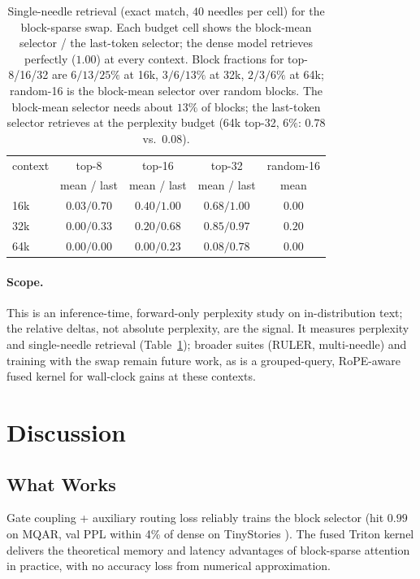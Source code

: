 \documentclass[10pt,letterpaper]{article}
\begin{document}
\begin{table}[h]
\centering
\caption{Single-needle retrieval (exact match, $40$ needles per cell) for the
block-sparse swap. Each budget cell shows the block-mean selector / the last-token
selector; the dense model retrieves perfectly ($1.00$) at every context. Block
fractions for top-8/16/32 are $6/13/25\%$ at 16k, $3/6/13\%$ at 32k, $2/3/6\%$ at
64k; random-16 is the block-mean selector over random blocks. The block-mean
selector needs about $13\%$ of blocks; the last-token selector retrieves at the
perplexity budget (64k top-32, $6\%$: $0.78$ vs.\ $0.08$).}
\label{tab:niah}
\small
\begin{tabular}{lcccc}
\toprule
context & top-8 & top-16 & top-32 & random-16 \\
 & mean / last & mean / last & mean / last & mean \\
\midrule
16k & $0.03/0.70$ & $0.40/1.00$ & $0.68/1.00$ & $0.00$ \\
32k & $0.00/0.33$ & $0.20/0.68$ & $0.85/0.97$ & $0.20$ \\
64k & $0.00/0.00$ & $0.00/0.23$ & $0.08/0.78$ & $0.00$ \\
\bottomrule
\end{tabular}
\end{table}

\paragraph{Scope.} This is an inference-time, forward-only perplexity study on
in-distribution text; the relative deltas, not absolute perplexity, are the signal.
It measures perplexity and single-needle retrieval (Table~\ref{tab:niah}); broader
suites (RULER, multi-needle) and training with the swap remain future work, as is a
grouped-query,
RoPE-aware fused kernel for wall-clock gains at these contexts.

\section{Discussion}\label{sec:discussion}

\subsection{What Works}

Gate coupling + auxiliary routing loss reliably trains the block selector
(hit $0.99$ on MQAR, val PPL within 4\% of dense on TinyStories
\cite{eldan2023tinystories}). The fused Triton kernel delivers the theoretical
memory and latency advantages of block-sparse attention in practice, with no
accuracy loss from numerical approximation.
\end{document}
